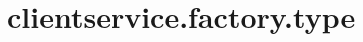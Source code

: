 \section{clientservice.factory.type}
\label{configuration:ClientserviceFactoryType}
\AvailableInCsharpOnly{\TODO}